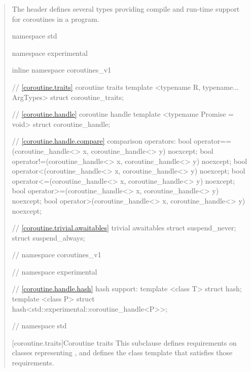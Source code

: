 \begin{quote}

\pnum
The header
defines several types providing compile and run-time support for coroutines in a \Cpp program.


%
%
\begin{codeblock}
namespace std {
namespace experimental {
inline namespace coroutines_v1 {

  // \ref{coroutine.traits} coroutine traits
  template <typename R, typename... ArgTypes>
    struct coroutine_traits;
  	
  // \ref{coroutine.handle} coroutine handle
  template <typename Promise = void>
    struct coroutine_handle;		
  
  // \ref{coroutine.handle.compare} comparison operators:	
  bool operator==(coroutine_handle<> x, coroutine_handle<> y) noexcept;
  bool operator!=(coroutine_handle<> x, coroutine_handle<> y) noexcept;
  bool operator<(coroutine_handle<> x, coroutine_handle<> y) noexcept;			
  bool operator<=(coroutine_handle<> x, coroutine_handle<> y) noexcept;			
  bool operator>=(coroutine_handle<> x, coroutine_handle<> y) noexcept;
  bool operator>(coroutine_handle<> x, coroutine_handle<> y) noexcept;
    
  // \ref{coroutine.trivial.awaitables} trivial awaitables
  struct suspend_never;
  struct suspend_always;
    
} // namespace coroutines_v1
} // namespace experimental

// \ref{coroutine.handle.hash} hash support:
template <class T> struct hash;
template <class P> struct hash<std::experimental::coroutine_handle<P>>;

} // namespace std
\end{codeblock}

[coroutine.traits]{Coroutine traits}
\pnum
This subclause defines requirements on classes representing
,
and defines the class template
that satisfies those requirements.



\end{quote}
